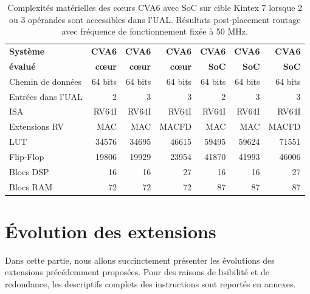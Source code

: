 \documentclass[../main.tex]{subfiles}
\begin{document}
\begin{table}[!tb]
    \centering
    \footnotesize
    \begin{tabular}{l|r|r|r|r|r|r}
    \toprule
        \textbf{Système}    & \textbf{CVA6} & \textbf{CVA6} & \textbf{CVA6} & \textbf{CVA6} & \textbf{CVA6} & \textbf{CVA6} \\
        \textbf{évalué}     & \textbf{cœur}& \textbf{cœur}& \textbf{cœur}& \textbf{SoC}  & \textbf{SoC}  & \textbf{SoC}  \\
    \midrule
        Chemin de données   & 64 bits       & 64 bits       & 64 bits       & 64 bits       & 64 bits       & 64 bits       \\
        Entrées dans l'UAL  & 2             & 3             & 3             & 2             & 3             & 3             \\ 
        ISA                 & RV64I         & RV64I         & RV64I         & RV64I         & RV64I         & RV64I         \\
        Extensions RV       & MAC           & MAC           & MACFD         & MAC           & MAC           & MACFD         \\
    \midrule
        LUT                 & 34576         & 34695         & 46615         & 59495         & 59624         & 71551         \\
        Flip-Flop           & 19806         & 19929         & 23954         & 41870         & 41993         & 46006         \\
        Blocs DSP           & 16            & 16            & 27            & 16            & 16            & 27            \\
        Blocs RAM           & 72            & 72            & 72            & 87            & 87            & 87            \\
    \bottomrule
    \end{tabular}
    \caption{Complexités matérielles des cœurs CVA6 avec SoC sur cible Kintex 7 lorsque 2 ou 3 opérandes sont accessibles dans l'UAL. Résultats post-placement routage avec fréquence de fonctionnement fixée à 50 MHz.}
    \label{tab:cva6:cost}
\end{table}
%
%
%
%
\section{Évolution des extensions}
%
%
%
%
Dans cette partie, nous allons succinctement présenter les évolutions des extensions précédemment proposées.
Pour des raisons de lisibilité et de redondance, les descriptifs complets des instructions sont reportés en annexes.
\end{document}
